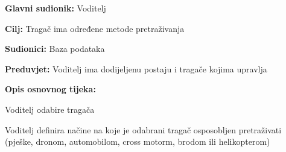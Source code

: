 					\noindent {}
					\begin{packed_item}
						
						\item \textbf{Glavni sudionik: }Voditelj
						\item  \textbf{Cilj:} Tragač ima određene metode pretraživanja
						\item  \textbf{Sudionici:} Baza podataka
						\item  \textbf{Preduvjet:} Voditelj ima dodijeljenu postaju i tragače kojima upravlja
						\item  \textbf{Opis osnovnog tijeka:}
						
						\item[] \begin{packed_enum}
							
							\item Voditelj odabire tragača
							\item Voditelj definira načine na koje je odabrani tragač osposobljen pretraživati (pješke, dronom, automobilom, cross motorm, brodom ili helikopterom)
							
							
						\end{packed_enum}
						
						
					\end{packed_item}
					
